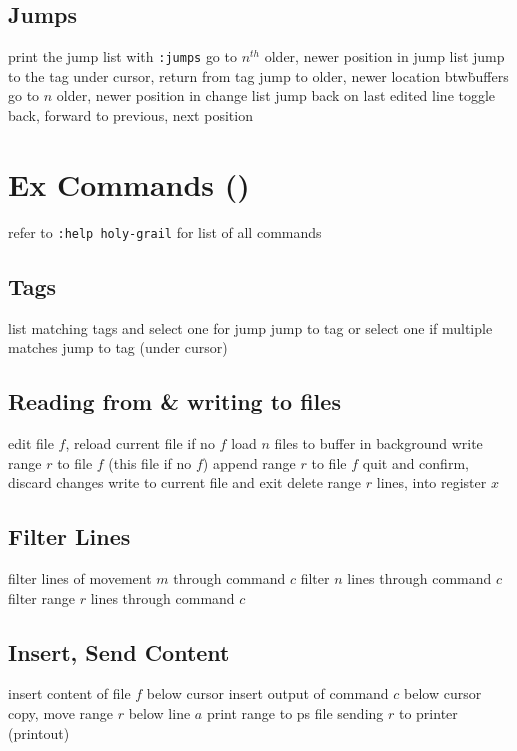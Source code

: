 \subsection{Jumps}	{print the jump list with {\tt :jumps}}
	{go to $n^{th}$ older, newer position in jump list}
\cmdS{\ctrl ] \ctrl T }	{jump to the tag under cursor, return from tag}
	{jump to older, newer location btw\. buffers}
	{go to $n$ older, newer position in change list}
	{jump back on last edited line}
	{toggle back, forward to previous, next position}

\section{Ex Commands (\enter)}	{refer to {\tt :help holy-grail} for list of all commands}
\subsection{Tags}	{}
	{list matching tags and select one for jump}
	{jump to tag or select one if multiple matches}
\cmdS{:ta\grey{g} \ctrl[ }	{jump to tag (under cursor)}

\subsection{Reading from \& writing to files}	{}
	{edit file $f$, reload current file if no $f$}
	{load $n$ files to buffer in background}
	{write range $r$ to file $f$ (this file if no $f$)}
	{append range $r$ to file $f$}
	{quit and confirm, discard changes}
	{write to current file and exit}
	{delete range $r$ lines, into register $x$}

\subsection{Filter Lines}{}
	{filter lines of movement $m$ through command $c$}
	{filter $n$ lines through command $c$}
	{filter range $r$ lines through command $c$}

\subsection{Insert, Send Content}	{}
	{insert content of file $f$ below cursor}
	{insert output of command $c$ below cursor}
	{copy, move range $r$ below line $a$}
	{print range to ps file}
	{sending $r$ to printer (printout)}

